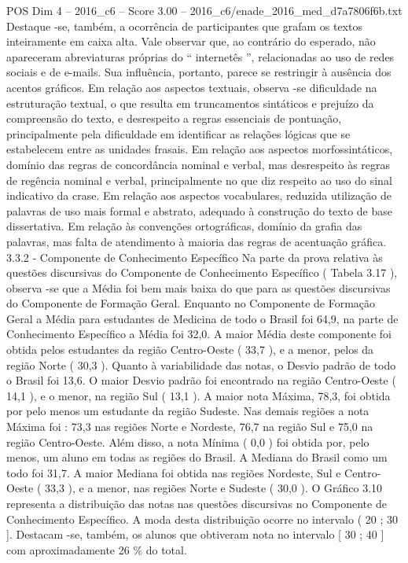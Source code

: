 \begin{textsample}{POS Dim 4 – 2016\_c6 – Score 3.00 – 2016\_c6/enade\_2016\_med\_d7a7806f6b.txt}
Destaque -se, também, a ocorrência de participantes que grafam os textos inteiramente em caixa alta.
Vale observar que, ao contrário do esperado, não apareceram abreviaturas próprias do “ internetês ”, relacionadas ao uso de redes sociais e de e-mails.
Sua influência, portanto, parece se restringir à ausência dos acentos gráficos.
Em relação aos aspectos textuais, observa -se dificuldade na estruturação textual, o que resulta em truncamentos sintáticos e prejuízo da compreensão do texto, e desrespeito a regras essenciais de pontuação, principalmente pela dificuldade em identificar as relações lógicas que se estabelecem entre as unidades frasais.
Em relação aos aspectos morfossintáticos, domínio das regras de concordância nominal e verbal, mas desrespeito às regras de regência nominal e verbal, principalmente no que diz respeito ao uso do sinal indicativo da crase.
Em relação aos aspectos vocabulares, reduzida utilização de palavras de uso mais formal e abstrato, adequado à construção do texto de base dissertativa.
Em relação às convenções ortográficas, domínio da grafia das palavras, mas falta de atendimento à maioria das regras de acentuação gráfica. 3.3.2 - Componente de Conhecimento Específico Na parte da prova relativa às questões discursivas do Componente de Conhecimento Específico ( Tabela 3.17 ), observa -se que a Média foi bem mais baixa do que para as questões discursivas do Componente de Formação Geral.
Enquanto no Componente de Formação Geral a Média para estudantes de Medicina de todo o Brasil foi 64,9, na parte de Conhecimento Específico a Média foi 32,0.
A maior Média deste componente foi obtida pelos estudantes da região Centro-Oeste ( 33,7 ), e a menor, pelos da região Norte ( 30,3 ).
Quanto à variabilidade das notas, o Desvio padrão de todo o Brasil foi 13,6.
O maior Desvio padrão foi encontrado na região Centro-Oeste ( 14,1 ), e o menor, na região Sul ( 13,1 ).
A maior nota Máxima, 78,3, foi obtida por pelo menos um estudante da região Sudeste.
Nas demais regiões a nota Máxima foi : 73,3 nas regiões Norte e Nordeste, 76,7 na região Sul e 75,0 na região Centro-Oeste.
Além disso, a nota Mínima ( 0,0 ) foi obtida por, pelo menos, um aluno em todas as regiões do Brasil.
A Mediana do Brasil como um todo foi 31,7.
A maior Mediana foi obtida nas regiões Nordeste, Sul e Centro-Oeste ( 33,3 ), e a menor, nas regiões Norte e Sudeste ( 30,0 ).
O Gráfico 3.10 representa a distribuição das notas nas questões discursivas no Componente de Conhecimento Específico.
A moda desta distribuição ocorre no intervalo ( 20 ; 30 ].
Destacam -se, também, os alunos que obtiveram nota no intervalo [ 30 ; 40 ] com aproximadamente 26 \% do total.

\end{textsample}
